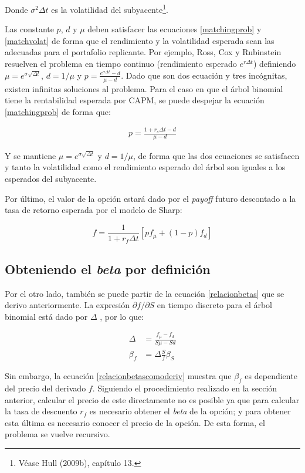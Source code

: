 Donde $\sigma^2 \Delta t$ es la volatilidad del subyacente\footnote{Véase Hull (2009b), capítulo 13.}.

Las constante $p$, $d$ y $\mu$ deben satisfacer las ecuaciones \eqref{matchingprob} y \eqref{matchvolat} de forma que el rendimiento y la volatilidad esperada sean las adecuadas para el portafolio replicante. Por ejemplo, Ross, Cox y Rubinstein resuelven el problema en tiempo continuo (rendimiento esperado $e^{r \Delta t}$) definiendo $\mu = e^{\sigma \sqrt{\Delta t}}$, $d=1/\mu$ y $p=\frac{e^{\sigma \Delta t}-d}{\mu-d}$. Dado que son dos ecuación y tres incógnitas, existen infinitas soluciones al problema. Para el caso en que el árbol binomial tiene la rentabilidad esperada por CAPM, se puede despejar la ecuación \eqref{matchingprob} de forma que:

\begin{align}
	p = \frac{1 + r_s \Delta t - d}{\mu-d} \label{probarbolcapm}
\end{align}

Y se mantiene $\mu = e^{\sigma \sqrt{\Delta t}}$ y $d=1/\mu$, de forma que las dos ecuaciones se satisfacen y tanto la volatilidad como el rendimiento esperado del árbol son iguales a los esperados del subyacente.

Por último, el valor de la opción estará dado por el \textit{payoff} futuro descontado a la tasa de retorno esperada por el modelo de Sharp:

\begin{equation}
	f = \frac{1}{1 + r_f \Delta t} [p f_\mu + (1-p) f_d] \label{discountPayoffs}
\end{equation}


\subsection{Obteniendo el \textit{beta} por definición}

Por el otro lado, también se puede partir de la ecuación \eqref{relacionbetas} que se derivo anteriormente. La expresión $\partial f / \partial S$ en tiempo discreto para el árbol binomial está dado por $\Delta$ \cite{appliedderiv}, por lo que:

\begin{align}
	\Delta &= \frac{ f_\mu - f_d }{ S \mu - S d }\\
	\beta_f &= \Delta \frac{S}{f} \beta_S \label{relacionbetascomoderiv}
\end{align}

Sin embargo, la ecuación \eqref{relacionbetascomoderiv} muestra que $\beta_f$ es dependiente del precio del derivado $f$. Siguiendo el procedimiento realizado en la sección anterior, calcular el precio de este directamente no es posible ya que para calcular la tasa de descuento $r_f$ es necesario obtener el \textit{beta} de la opción; y para obtener esta última es necesario conocer el precio de la opción. De esta forma, el problema se vuelve recursivo.

